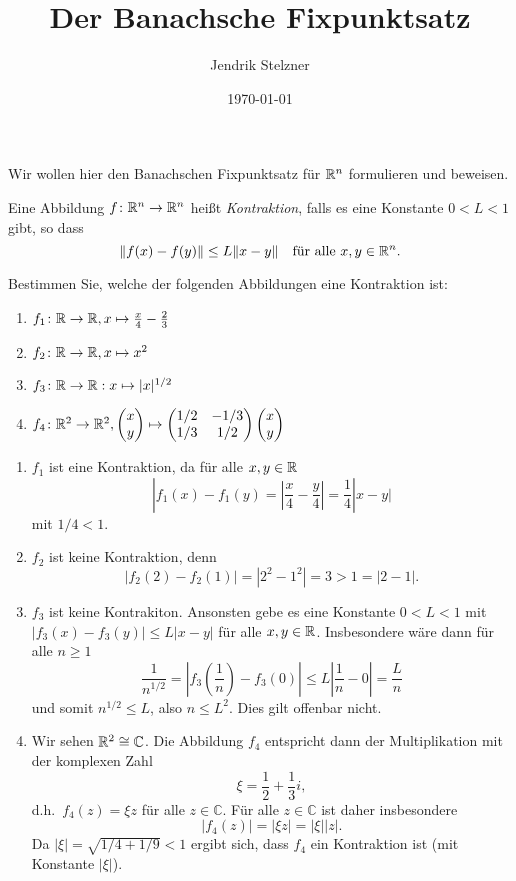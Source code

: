 \documentclass[a4paper,10pt]{article}
\title{Der Banachsche Fixpunktsatz}
\author{Jendrik Stelzner}
\date{\today}
\begin{document}
\maketitle


Wir wollen hier den Banachschen Fixpunktsatz für $\mathbb{R}^n$ formulieren und beweisen.


\begin{defi}
 Eine Abbildung $f \colon \mathbb{R}^n \to \mathbb{R}^n$ heißt \emph{Kontraktion}, falls es eine Konstante $0 < L < 1$ gibt, so dass
 \[
  \|f(x)-f(y)\| \leq L\|x-y\| \quad \text{für alle $x,y \in \mathbb{R}^n$}.
 \]
\end{defi}


\begin{question}
 Bestimmen Sie, welche der folgenden Abbildungen eine Kontraktion ist:
 \begin{enumerate}
  \item
   $f_1 \colon \mathbb{R} \to \mathbb{R}, x \mapsto \frac{x}{4} - \frac{2}{3}$
  \item
   $f_2 \colon \mathbb{R} \to \mathbb{R}, x \mapsto x^2$
  \item
   $f_3 \colon \mathbb{R} \to \mathbb{R}: x \mapsto |x|^{1/2}$
  \item
   $f_4 \colon \mathbb{R}^2 \to \mathbb{R}^2, \begin{pmatrix} x\\y \end{pmatrix} \mapsto \begin{pmatrix} 1/2 & -1/3 \\ 1/3 & 1/2 \end{pmatrix} \begin{pmatrix} x\\y \end{pmatrix}$
 \end{enumerate}
\end{question}
\begin{solution}
 \begin{enumerate}
  \item
   $f_1$ ist eine Kontraktion, da für alle $x,y \in \mathbb{R}$
   \[
    |f_1(x)-f_1(y) = \left| \frac{x}{4} - \frac{y}{4} \right| = \frac{1}{4}|x-y|
   \]
   mit $1/4 < 1$.
  \item
   $f_2$ ist keine Kontraktion, denn
   \[
    |f_2(2)-f_2(1)| = |2^2 - 1^2| = 3 > 1 = |2-1|.
   \]
  \item
   $f_3$ ist keine Kontrakiton. Ansonsten gebe es eine Konstante $0 < L < 1$ mit $|f_3(x)-f_3(y)| \leq L|x-y|$ für alle $x, y \in \mathbb{R}$. Insbesondere wäre dann für alle $n \geq 1$
   \[
    \frac{1}{n^{1/2}}
    = \left|f_3\left(\frac{1}{n}\right) - f_3(0)\right|
    \leq L\left| \frac{1}{n} - 0\right|
    = \frac{L}{n}
   \]
   und somit $n^{1/2} \leq L$, also $n \leq L^2$. Dies gilt offenbar nicht.
  \item
   Wir sehen $\mathbb{R}^2 \cong \mathbb{C}$. Die Abbildung $f_4$ entspricht dann der Multiplikation mit der komplexen Zahl
   \[
    \xi = \frac{1}{2} + \frac{1}{3} i,
   \]
   d.h.\ $f_4(z) = \xi z$ für alle $z \in \mathbb{C}$. Für alle $z \in \mathbb{C}$ ist daher insbesondere
   \[
    |f_4(z)| = |\xi z| = |\xi| |z|.
   \]
   Da $|\xi| = \sqrt{1/4 + 1/9} < 1$ ergibt sich, dass $f_4$ ein Kontraktion ist (mit Konstante $|\xi|$).
 \end{enumerate}
\end{solution}
\end{document}
